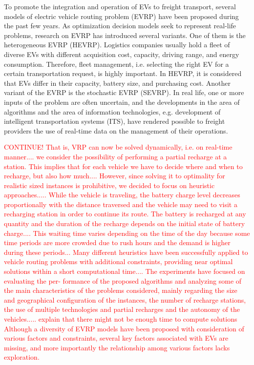 \documentclass[11pt]{article}
\begin{document}
To promote the integration and operation of EVs to freight transport, several models of electric vehicle routing problem (EVRP) have been proposed during the past few years. As optimization decision models seek to represent real-life problems, research on EVRP has introduced several variants. One of them is the heterogeneous EVRP (HEVRP). Logistics companies usually hold a fleet of diverse EVs with different acquisition cost, capacity, driving range, and energy consumption. Therefore, fleet management, i.e. selecting the right EV for a certain transportation request, is highly important. In HEVRP, it is considered that EVs differ in their capacity, battery size, and purchasing cost. Another variant of the EVRP is the stochastic EVRP (SEVRP). In real life, one or more inputs of the problem are often uncertain, and the developments in the area of algorithms and the area of information technologies, e.g. development of intelligent transportation systems (ITS), have rendered possible to freight providers the use of real-time data on the management of their operations. 

\textcolor{red}{CONTINUE! That is, VRP can now be solved dynamically, i.e. on real-time manner....
we consider the possibility of performing a partial recharge at a station. This implies that for each vehicle we have to decide where and when to recharge, but also how much....
However, since solving it to optimality for realistic sized instances is prohibitive, we decided to focus on heuristic approaches.....
While the vehicle is traveling, the battery charge level decreases proportionally with the distance traversed and the vehicle may need to visit a recharging station in order to continue its route. The battery is recharged at any quantity and the duration of the recharge depends on the initial state of battery charge....
This waiting time varies depending on the time of the day because some time periods are more crowded due to rush hours and the demand is higher during these periods...
Many different heuristics have been successfully applied to vehicle routing problems with additional constraints, providing near optimal solutions within a short computational time....
The experiments have focused on evaluating the per- formance of the proposed algorithms and analyzing some of the main characteristics of the problems considered, mainly regarding the size and geographical configuration of the instances, the number of recharge stations, the use of multiple technologies and partial recharges and the autonomy of the vehicles.....
explain that there might not be enough time to compute solutions
Although a diversity of EVRP models have been proposed with consideration of various factors and constraints, several key factors associated with EVs are missing, and more importantly the relationship among various factors lacks exploration. }
\end{document}
